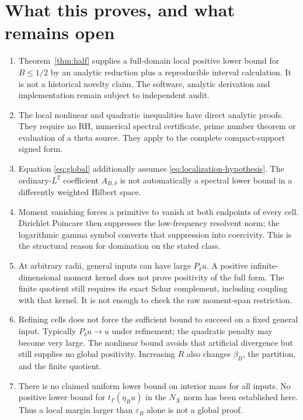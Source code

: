 \documentclass[11pt]{article}
\begin{document}
\section{What this proves, and what remains open}
\begin{enumerate}
\item Theorem~\ref{thm:half} supplies a full-domain local positive lower
bound for $B\le1/2$ by an analytic reduction plus a reproducible interval
calculation. It is not a historical novelty claim. The software, analytic
derivation and implementation remain subject to independent audit.
\item The local nonlinear and quadratic inequalities have direct analytic proofs. They require no RH, numerical spectral certificate, prime number theorem or evaluation of a theta source. They apply to the complete compact-support signed form.
\item Equation \eqref{eq:global} additionally assumes \eqref{eq:localization-hypothesis}. The ordinary-$L^2$ coefficient $A_{B,\delta}$ is not automatically a spectral lower bound in a differently weighted Hilbert space.
\item Moment vanishing forces a primitive to vanish at both endpoints of every cell. Dirichlet Poincare then suppresses the low-frequency resolvent norm; the logarithmic gamma symbol converts that suppression into coercivity. This is the structural reason for domination on the stated class.
\item At arbitrary radii, general inputs can have large $P_\delta u$. A positive infinite-dimensional moment kernel does not prove positivity of the full form. The finite quotient still requires its exact Schur complement, including coupling with that kernel. It is not enough to check the raw moment-span restriction.
\item Refining cells does not force the sufficient bound to succeed on a fixed general input. Typically $P_\delta u\to u$ under refinement; the quadratic penalty may become very large. The nonlinear bound avoids that artificial divergence but still supplies no global positivity. Increasing $R$ also changes $\beta_B$, the partition, and the finite quotient.
\item There is no claimed uniform lower bound on interior mass for all inputs. No positive lower bound for $t_\Gamma(\eta_Ru)$ in the $N_X$ norm has been established here. Thus a local margin larger than $\varepsilon_R$ alone is not a global proof.
\end{enumerate}
\end{document}
